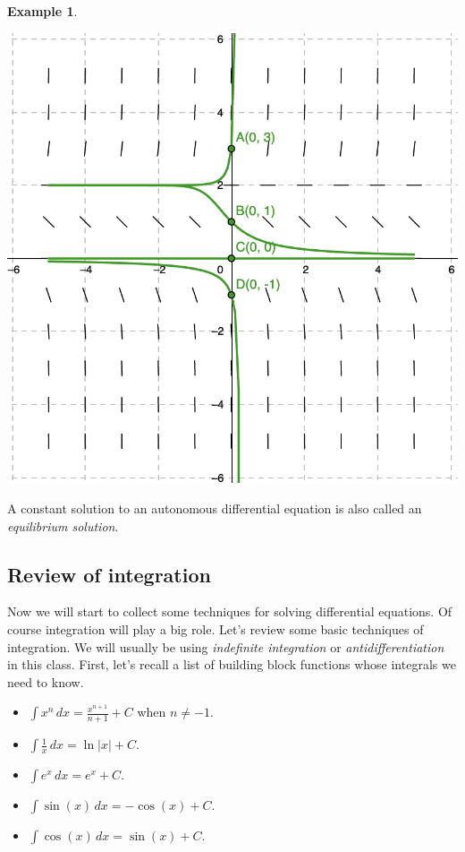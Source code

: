 \documentclass[12pt]{amsart}
\numberwithin{equation}{section}
\theoremstyle{plain} %
\theoremstyle{definition}
\newtheorem{ex}[equation]{Example}
\theoremstyle{remark}
\begin{document}
\begin{ex}
\begin{center}\includegraphics[scale=.5]{sf6}\end{center}
\end{ex}

A constant solution to an autonomous differential equation is also called an \emph{equilibrium solution}.


\subsection*{Review of integration} Now we will start to collect some techniques for solving differential equations. Of course integration will play a big role. Let's review some basic techniques of integration. We will usually be using \emph{indefinite integration} or \emph{antidifferentiation} in this class. First, let's recall a list of building block functions whose integrals we need to know. 

\begin{itemize}
\item $\int x^n \, dx = \frac{x^{n+1}}{n+1} + C$ when $n\neq -1$.
\item $\int \frac{1}{x} \, dx = \ln|x| + C$.
\item $\int e^x \, dx = e^x + C$.
\item $\int \sin(x) \, dx = -\cos(x) + C$.
\item $\int \cos(x) \, dx = \sin(x) + C$.
\end{itemize}
\end{document}
